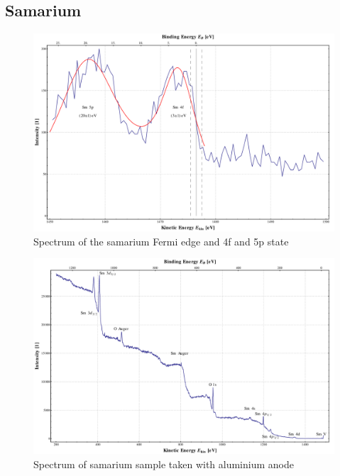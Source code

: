 \documentclass[a4paper,10pt]{scrartcl}
\begin{document}
\subsection{Samarium}

\begin{figure}
\centering
\includegraphics[scale=0.3]{img/samarium_fermiedge_al}
\caption{Spectrum of the samarium Fermi edge and 4f and 5p state \label{fig:sm_fermi}}
\end{figure}

\begin{figure}
\centering
\includegraphics[scale=0.3]{img/samarium_binding_al}
\caption{Spectrum of samarium sample taken with aluminium anode \label{fig:sm_al}}
\end{figure}
\end{document}
